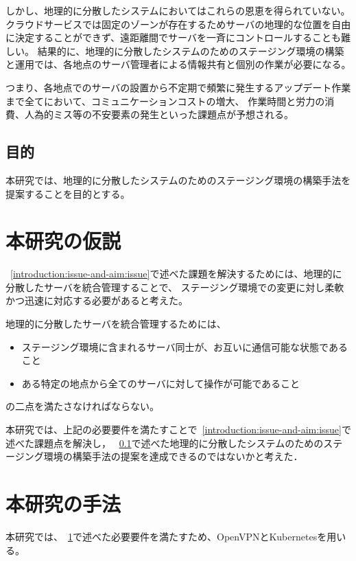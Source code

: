 しかし、地理的に分散したシステムにおいてはこれらの恩恵を得られていない。
クラウドサービスでは固定のゾーンが存在するためサーバの地理的な位置を自由に決定することができず、遠距離間でサーバを一斉にコントロールすることも難しい。
結果的に、地理的に分散したシステムのためのステージング環境の構築と運用では、各地点のサーバ管理者による情報共有と個別の作業が必要になる。

つまり、各地点でのサーバの設置から不定期で頻繁に発生するアップデート作業まで全てにおいて、コミュニケーションコストの増大、
作業時間と労力の消費、人為的ミス等の不安要素の発生といった課題点が予想される。

\subsection{目的}
\label{introduction:issue-and-aim:aim}

本研究では、地理的に分散したシステムのためのステージング環境の構築手法を提案することを目的とする。

\section{本研究の仮説}
\label{introduction:hypothesis}

~\ref{introduction:issue-and-aim:issue}で述べた課題を解決するためには、地理的に分散したサーバを統合管理することで、
ステージング環境での変更に対し柔軟かつ迅速に対応する必要があると考えた。

地理的に分散したサーバを統合管理するためには、
\begin{itemize}
  \item ステージング環境に含まれるサーバ同士が、お互いに通信可能な状態であること
  \item ある特定の地点から全てのサーバに対して操作が可能であること
\end{itemize}
の二点を満たさなければならない。

本研究では、上記の必要要件を満たすことで~\ref{introduction:issue-and-aim:issue}で述べた課題点を解決し，
~\ref{introduction:issue-and-aim:aim}で述べた地理的に分散したシステムのためのステージング環境の構築手法の提案を達成できるのではないかと考えた．

\section{本研究の手法}
\label{introduction:proposal}

本研究では、~\ref{introduction:hypothesis}で述べた必要要件を満たすため、OpenVPNとKubernetesを用いる。

